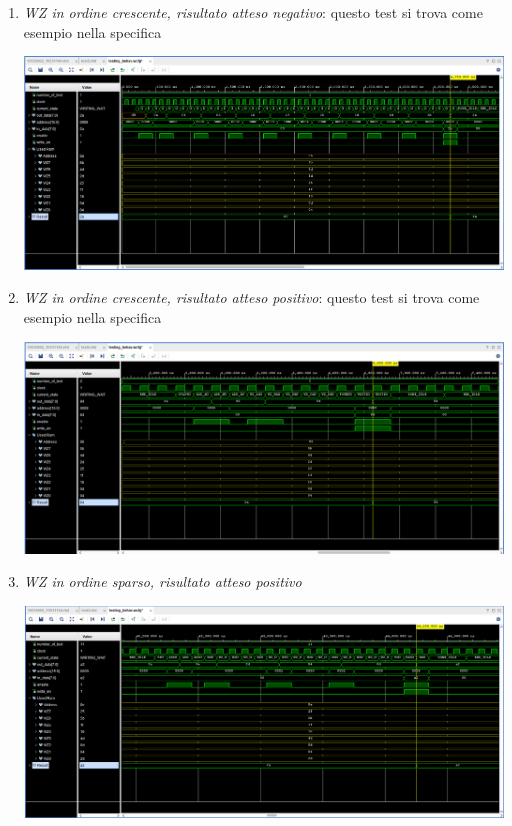 \documentclass[12pt,a4paper,titlepage]{article}
\begin{document}
	\begin{enumerate}
	
	\item \textit{WZ in ordine crescente, risultato atteso negativo}: questo test si trova come esempio nella specifica
		\begin{center}
			\includegraphics[scale=0.4]{test1.png}
		\end{center}
	
	\item \textit{WZ in ordine crescente, risultato atteso positivo}: questo test si trova come esempio nella specifica
	
		\begin{center}
			\includegraphics[scale=0.4]{test2.png}
		\end{center}

	\item \textit{WZ in ordine sparso, risultato atteso positivo}
	
		\begin{center}
			\includegraphics[scale=0.4]{test11.png}
		\end{center}


\end{enumerate}
\end{document}
